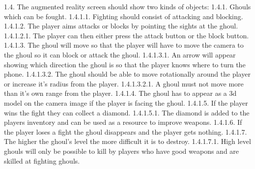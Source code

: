 \documentclass[11pt,openright,a4paper]{report}
\newcommand{\forceindent}{\leavevmode{\parindent=1em\indent}}
\begin{document}
		\forceindent 1.4. The augmented reality screen should show two kinds of objects:
		\forceindent \forceindent 1.4.1. Ghouls which can be fought.\newline
		\forceindent \forceindent \forceindent 1.4.1.1. Fighting should consist of attacking and blocking.\newline
		\forceindent \forceindent \forceindent 1.4.1.2. The player aims attacks or blocks by pointing the sights at the ghoul. \newline
		\forceindent \forceindent \forceindent \forceindent 1.4.1.2.1. The player can then either press the attack button or the block button.\newline
		\forceindent \forceindent \forceindent 1.4.1.3. The ghoul will move so that the player will have to move the camera to the ghoul so it can block or attack the ghoul.\newline
		\forceindent \forceindent \forceindent \forceindent 1.4.1.3.1. An arrow will appear showing which direction the ghoul is so that the player knows where to turn the phone.\newline
		\forceindent \forceindent \forceindent \forceindent 1.4.1.3.2. The ghoul should be able to move rotationally around the player or increase it's radius from the player.\newline
		\forceindent \forceindent \forceindent \forceindent \forceindent 1.4.1.3.2.1. A ghoul must not move more than it's own range from the player. \newline
		\forceindent \forceindent \forceindent  1.4.1.4. The ghoul has to appear as a 3d model on the camera image if the player is facing the ghoul.\newline
		\forceindent \forceindent \forceindent 1.4.1.5. If the player wins the fight they can collect a diamond.
		\forceindent \forceindent \forceindent \forceindent 1.4.1.5.1. The diamond is added to the players inventory and can be used as a resource to improve weapons.\newline
		\forceindent \forceindent \forceindent 1.4.1.6. If the player loses a fight the ghoul disappears and the player gets nothing.\newline
		\forceindent \forceindent \forceindent 1.4.1.7. The higher the ghoul's level the more difficult it is to destroy.\newline
		\forceindent \forceindent \forceindent \forceindent 1.4.1.7.1. High level ghouls will only be possible to kill by players who have good weapons and are skilled at fighting ghouls.\newline
\end{document}

